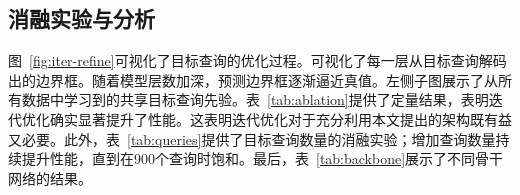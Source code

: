 \begin{table}[t] 
\begin{center}
\caption{与伪激光雷达方法对比。\label{pseudolidar}}
\vspace{-1em}
\end{center}
  \vspace{-0.8em}
\end{table}

\subsection{消融实验与分析}
\label{ablation}

图~\ref{fig:iter-refine}可视化了目标查询的优化过程。可视化了每一层从目标查询解码出的边界框。随着模型层数加深，预测边界框逐渐逼近真值。左侧子图展示了从所有数据中学习到的共享目标查询先验。表~\ref{tab:ablation}提供了定量结果，表明迭代优化确实显著提升了性能。这表明迭代优化对于充分利用本文提出的架构既有益又必要。此外，表~\ref{tab:queries}提供了目标查询数量的消融实验；增加查询数量持续提升性能，直到在900个查询时饱和。最后，表~\ref{tab:backbone}展示了不同骨干网络的结果。

